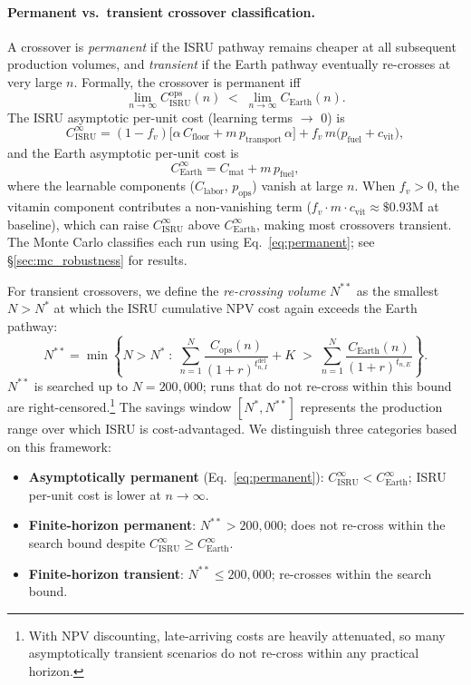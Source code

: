 \documentclass[preprint,12pt]{elsarticle}
\begin{document}
\paragraph{Permanent vs.\ transient crossover classification.} A crossover is \emph{permanent} if the ISRU pathway remains cheaper at all subsequent production volumes, and \emph{transient} if the Earth pathway eventually re-crosses at very large $n$. Formally, the crossover is permanent iff
\begin{equation}
  \lim_{n \to \infty} C_{\mathrm{ISRU}}^{\mathrm{ops}}(n) \;<\; \lim_{n \to \infty} C_{\mathrm{Earth}}(n).
  \label{eq:permanent}
\end{equation}
The ISRU asymptotic per-unit cost (learning terms $\to$ 0) is
\[
  C_{\mathrm{ISRU}}^{\infty} = (1 - f_v)\bigl[\alpha \, C_{\mathrm{floor}} + m \, p_{\mathrm{transport}} \, \alpha\bigr] + f_v \, m \bigl(p_{\mathrm{fuel}} + c_{\mathrm{vit}}\bigr),
\]
and the Earth asymptotic per-unit cost is
\[
  C_{\mathrm{Earth}}^{\infty} = C_{\mathrm{mat}} + m \, p_{\mathrm{fuel}},
\]
where the learnable components ($C_{\mathrm{labor}}$, $p_{\mathrm{ops}}$) vanish at large $n$. When $f_v > 0$, the vitamin component contributes a non-vanishing term ($f_v \cdot m \cdot c_{\mathrm{vit}} \approx \$0.93$M at baseline), which can raise $C_{\mathrm{ISRU}}^{\infty}$ above $C_{\mathrm{Earth}}^{\infty}$, making most crossovers transient. The Monte Carlo classifies each run using Eq.~\ref{eq:permanent}; see \S\ref{sec:mc_robustness} for results.

For transient crossovers, we define the \emph{re-crossing volume} $N^{**}$ as the smallest $N > N^*$ at which the ISRU cumulative NPV cost again exceeds the Earth pathway:
\begin{equation}
  N^{**} = \min\!\left\{N > N^* \;:\; \sum_{n=1}^{N} \frac{C_{\mathrm{ops}}(n)}{(1+r)^{t_{n,I}^{\mathrm{del}}}} + K \;>\; \sum_{n=1}^{N} \frac{C_{\mathrm{Earth}}(n)}{(1+r)^{t_{n,E}}}\right\}.
  \label{eq:recrossing}
\end{equation}
$N^{**}$ is searched up to $N = 200{,}000$; runs that do not re-cross within this bound are right-censored.\footnote{With NPV discounting, late-arriving costs are heavily attenuated, so many asymptotically transient scenarios do not re-cross within any practical horizon.} The savings window $[N^*, N^{**}]$ represents the production range over which ISRU is cost-advantaged. We distinguish three categories based on this framework:
\begin{itemize}
\item \textbf{Asymptotically permanent} (Eq.~\ref{eq:permanent}): $C_{\mathrm{ISRU}}^{\infty} < C_{\mathrm{Earth}}^{\infty}$; ISRU per-unit cost is lower at $n \to \infty$.
\item \textbf{Finite-horizon permanent}: $N^{**} > 200{,}000$; does not re-cross within the search bound despite $C_{\mathrm{ISRU}}^{\infty} \geq C_{\mathrm{Earth}}^{\infty}$.
\item \textbf{Finite-horizon transient}: $N^{**} \leq 200{,}000$; re-crosses within the search bound.
\end{itemize}
\end{document}
